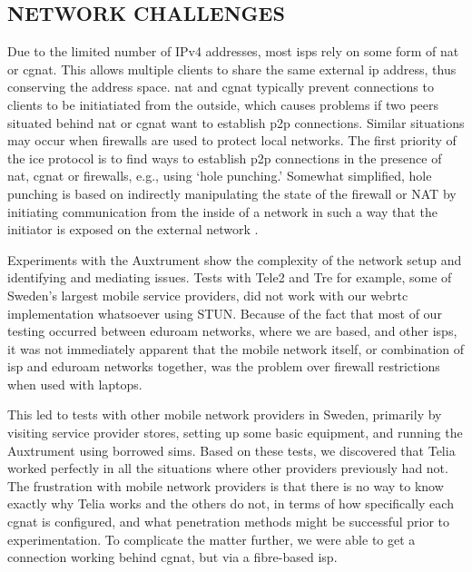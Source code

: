 \documentclass[fleqn]{jaes}
\begin{document}
\subsection{NETWORK CHALLENGES}
Due to the limited number of IPv4 addresses, most \Glspl{isp} rely on some form of \gls{nat} or \gls{cgnat}. This allows multiple clients to share the same external \gls{ip} address, thus conserving the address space. \gls{nat} and \gls{cgnat} typically prevent connections to clients to be initiatiated from the outside, which causes problems if two peers situated behind \gls{nat} or \gls{cgnat} want to establish \gls{p2p} connections. Similar situations may occur when firewalls are used to protect local networks. The first priority of the \gls{ice} protocol is to find ways to establish \gls{p2p} connections in the presence of \gls{nat}, \gls{cgnat} or firewalls, e.g., using `hole punching.' Somewhat simplified, hole punching is based on indirectly manipulating the state of the firewall or NAT by initiating communication from the inside of a network in such a way that the initiator is exposed on the external network \cite{ford2005peer}.

Experiments with the Auxtrument show the complexity of the network setup and identifying and mediating issues. Tests with Tele2 and Tre for example, some of Sweden's largest mobile service providers, did not work with our \gls{webrtc} implementation whatsoever using STUN. Because of the fact that most of our testing occurred between eduroam networks, where we are based, and other \Glspl{isp}, it was not immediately apparent that the mobile network itself, or combination of \gls{isp} and eduroam networks together, was the problem over firewall restrictions when used with laptops.

This led to tests with other mobile network providers in Sweden, primarily by visiting service provider stores, setting up some basic equipment, and running the Auxtrument using borrowed \glspl{sim}. Based on these tests, we discovered that Telia worked perfectly in all the situations where other providers previously had not. The frustration with mobile network providers is that there is no way to know exactly why Telia works and the others do not, in terms of how specifically each \gls{cgnat} is configured, and what penetration methods might be successful prior to experimentation. To complicate the matter further, we were able to get a connection working behind \gls{cgnat}, but via a fibre-based \gls{isp}.
\end{document}
